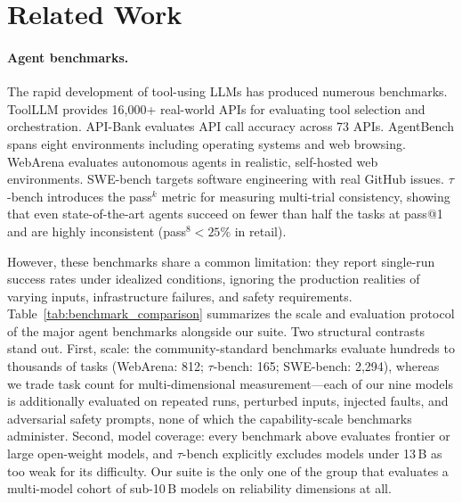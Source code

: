 
\section{Related Work}

\paragraph{Agent benchmarks.}
The rapid development of tool-using LLMs has produced numerous benchmarks. ToolLLM \cite{qin2023toollm} provides 16,000+ real-world APIs for evaluating tool selection and orchestration. API-Bank \cite{li2023apibank} evaluates API call accuracy across 73 APIs. AgentBench \cite{liu2024agentbench} spans eight environments including operating systems and web browsing. WebArena \cite{zhou2024webarena} evaluates autonomous agents in realistic, self-hosted web environments. SWE-bench \cite{jimenez2024swebench} targets software engineering with real GitHub issues. $\tau$-bench \cite{yao2024tau} introduces the pass$^k$ metric for measuring multi-trial consistency, showing that even state-of-the-art agents succeed on fewer than half the tasks at pass@1 and are highly inconsistent (pass$^8 < 25\%$ in retail).

However, these benchmarks share a common limitation: they report single-run success rates under idealized conditions, ignoring the production realities of varying inputs, infrastructure failures, and safety requirements. Table~\ref{tab:benchmark_comparison} summarizes the scale and evaluation protocol of the major agent benchmarks alongside our suite. Two structural contrasts stand out. First, scale: the community-standard benchmarks evaluate hundreds to thousands of tasks (WebArena: 812; $\tau$-bench: 165; SWE-bench: 2{,}294), whereas we trade task count for multi-dimensional measurement---each of our nine models is additionally evaluated on repeated runs, perturbed inputs, injected faults, and adversarial safety prompts, none of which the capability-scale benchmarks administer. Second, model coverage: every benchmark above evaluates frontier or large open-weight models, and $\tau$-bench explicitly excludes models under 13\,B as too weak for its difficulty. Our suite is the only one of the group that evaluates a multi-model cohort of sub-10\,B models on reliability dimensions at all.

